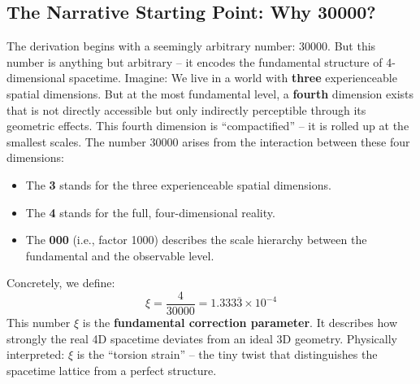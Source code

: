 	\subsection{The Narrative Starting Point: Why 30000?}
	The derivation begins with a seemingly arbitrary number: \(30000\). But this number is anything but arbitrary -- it encodes the fundamental structure of 4-dimensional spacetime.
	Imagine: We live in a world with \textbf{three} experienceable spatial dimensions. But at the most fundamental level, a \textbf{fourth} dimension exists that is not directly accessible but only indirectly perceptible through its geometric effects. This fourth dimension is \enquote{compactified} -- it is rolled up at the smallest scales.
	The number \(30000\) arises from the interaction between these four dimensions:
	\begin{itemize}
		\item The \textbf{3} stands for the three experienceable spatial dimensions.
		\item The \textbf{4} stands for the full, four-dimensional reality.
		\item The \textbf{000} (i.e., factor 1000) describes the scale hierarchy between the fundamental and the observable level.
	\end{itemize}
	Concretely, we define:
	\begin{equation}
		\boxed{\xi = \frac{4}{30000} = 1.333\overline{3} \times 10^{-4}}
	\end{equation}
	This number \(\xi\) is the \textbf{fundamental correction parameter}. It describes how strongly the real 4D spacetime deviates from an ideal 3D geometry. Physically interpreted: \(\xi\) is the \enquote{torsion strain} -- the tiny twist that distinguishes the spacetime lattice from a perfect structure.
